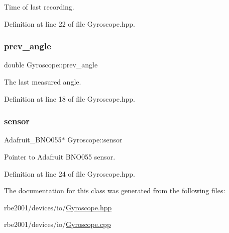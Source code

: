 Time of last recording. 



Definition at line 22 of file Gyroscope.\+hpp.

\mbox{\label{class_gyroscope_a05294072cbb0e362975d3f0ad626b716}} 
\subsubsection{\texorpdfstring{prev\+\_\+angle}{prev\_angle}}
{\footnotesize\ttfamily double Gyroscope\+::prev\+\_\+angle\hspace{0.3cm}{\ttfamily [private]}}



The last measured angle. 



Definition at line 18 of file Gyroscope.\+hpp.

\mbox{\label{class_gyroscope_a7a8dacdbe6d1fcd8004fa62b0997e2bf}} 
\subsubsection{\texorpdfstring{sensor}{sensor}}
{\footnotesize\ttfamily Adafruit\+\_\+\+B\+N\+O055$\ast$ Gyroscope\+::sensor\hspace{0.3cm}{\ttfamily [private]}}



Pointer to Adafruit B\+N\+O055 sensor. 



Definition at line 24 of file Gyroscope.\+hpp.



The documentation for this class was generated from the following files\+:\begin{DoxyCompactItemize}
\item 
rbe2001/devices/io/\hyperlink{_gyroscope_8hpp}{Gyroscope.\+hpp}\item 
rbe2001/devices/io/\hyperlink{_gyroscope_8cpp}{Gyroscope.\+cpp}\end{DoxyCompactItemize}
